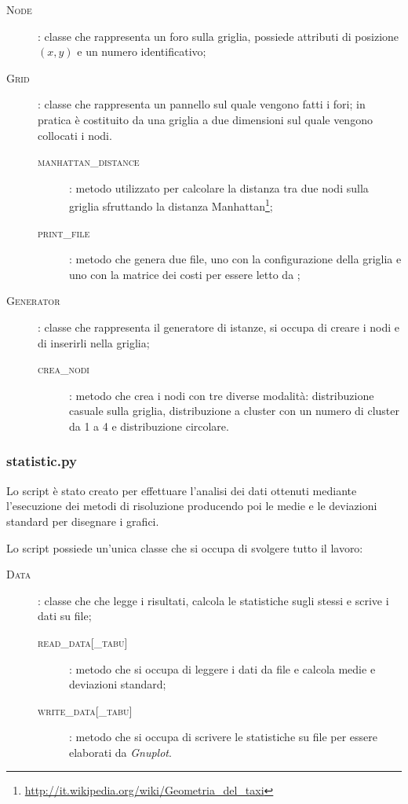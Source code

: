\begin{description}
	\item[\textsc{Node}]: classe che rappresenta un foro sulla griglia, possiede attributi di posizione $(x, y)$ e un numero identificativo;
	\item[\textsc{Grid}]: classe che rappresenta un pannello sul quale vengono fatti i fori; in pratica è costituito da una griglia a due dimensioni sul quale vengono collocati i nodi.
	\begin{description}
		\item[\textsc{manhattan\_distance}]: metodo utilizzato per calcolare la distanza tra due nodi sulla griglia sfruttando la distanza Manhattan\footnote{\url{http://it.wikipedia.org/wiki/Geometria_del_taxi}};
		\item[\textsc{print\_file}]: metodo che genera due file, uno con la configurazione della griglia e uno con la matrice dei costi per essere letto da ;
	\end{description}
	\item[\textsc{Generator}]: classe che rappresenta il generatore di istanze, si occupa di creare i nodi e di inserirli nella griglia;
	\begin{description}
		\item[\textsc{crea\_nodi}]: metodo che crea i nodi con tre diverse modalità: distribuzione casuale sulla griglia, distribuzione a cluster con un numero di cluster da 1 a 4 e distribuzione circolare.
	\end{description}
\end{description}

\subsubsection{statistic.py}
Lo script  è stato creato per effettuare l'analisi dei dati ottenuti mediante l'esecuzione dei metodi di risoluzione producendo poi le medie e le deviazioni standard per disegnare i grafici.

Lo script possiede un'unica classe che si occupa di svolgere tutto il lavoro:
\begin{description}
	\item[\textsc{Data}]: classe che che legge i risultati, calcola le statistiche sugli stessi e scrive i dati su file;
	\begin{description}
		\item[\textsc{read\_data[\_tabu]}]: metodo che si occupa di leggere i dati da file e calcola medie e deviazioni standard;
		\item[\textsc{write\_data[\_tabu]}]: metodo che si occupa di scrivere le statistiche su file per essere elaborati da \emph{Gnuplot}.
	\end{description}
\end{description}

